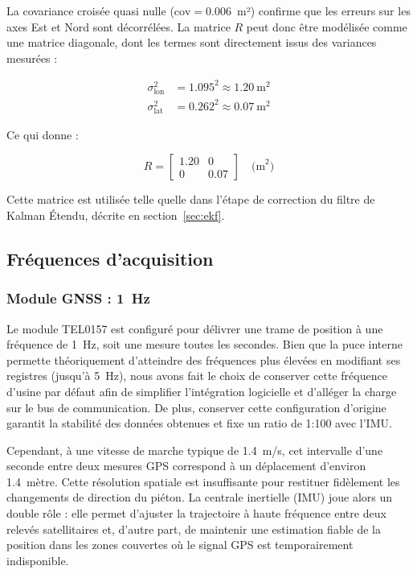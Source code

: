 La covariance croisée quasi nulle ($\text{cov} = 0.006$~m²) confirme que les
erreurs sur les axes Est et Nord sont décorrélées. La matrice $R$ peut donc
être modélisée comme une matrice diagonale, dont les termes sont directement
issus des variances mesurées :

\begin{align}
    \sigma_{\text{lon}}^2 &= 1.095^2 \approx 1.20 \ \text{m}^2 \\
    \sigma_{\text{lat}}^2 &= 0.262^2 \approx 0.07 \ \text{m}^2
\end{align}

Ce qui donne :

\begin{equation}
    R = \begin{bmatrix} 1.20 & 0 \\ 0 & 0.07 \end{bmatrix} \quad \text{(m}^2\text{)}
\end{equation}

Cette matrice est utilisée telle quelle dans l'étape de correction du filtre
de Kalman Étendu, décrite en section~\ref{sec:ekf}.

\subsection{Fréquences d'acquisition}

\subsubsection{Module GNSS : 1~Hz}

Le module TEL0157 est configuré pour délivrer une trame de position à une fréquence de 1~Hz, soit une mesure toutes les secondes. Bien que la puce interne permette théoriquement d'atteindre des fréquences plus élevées en modifiant ses registres (jusqu'à 5~Hz), nous avons fait le choix de conserver cette fréquence d'usine par défaut afin de simplifier l'intégration logicielle et d'alléger la charge sur le bus de communication. De plus, conserver cette configuration d'origine garantit la stabilité des données obtenues et fixe un ratio de 1:100 avec l'IMU.

Cependant, à une vitesse de marche typique de 1.4~m/s, cet intervalle d'une seconde entre deux mesures GPS correspond à un déplacement d'environ 1.4~mètre. Cette résolution spatiale est insuffisante pour restituer fidèlement les changements de direction du piéton. La centrale inertielle (IMU) joue alors un double rôle : elle permet d'ajuster la trajectoire à haute fréquence entre deux relevés satellitaires et, d'autre part, de maintenir une estimation fiable de la position dans les zones couvertes où le signal GPS est temporairement indisponible.


